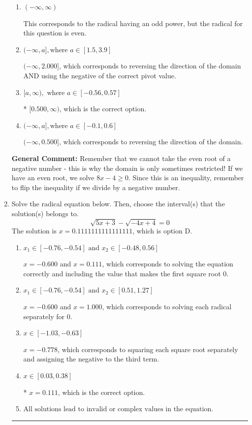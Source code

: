 \documentclass{extbook}[14pt]
\newcommand{\litem}[1]{\item #1

\rule{\textwidth}{0.4pt}}
\begin{document}
\begin{enumerate}
{\begin{enumerate}[label=\Alph*.]
$[2.000, \infty)$, which corresponds to using the negative of the correct pivot value.
\item \( (-\infty, \infty) \)

This corresponds to the radical having an odd power, but the radical for this question is even.
\item \( (-\infty, a], \text{where } a \in [1.5, 3.9] \)

$(-\infty, 2.000]$, which corresponds to reversing the direction of the domain AND using the negative of the correct pivot value.
\item \( [a, \infty), \text{ where } a \in [-0.56, 0.57] \)

* $[0.500, \infty)$, which is the correct option.
\item \( (-\infty, a], \text{where } a \in [-0.1, 0.6] \)

 $(-\infty, 0.500]$, which corresponds to reversing the direction of the domain.
\end{enumerate}

\textbf{General Comment:} Remember that we cannot take the even root of a negative number - this is why the domain is only sometimes restricted! If we have an even root, we solve $8 x - 4 \geq 0$. Since this is an inequality, remember to flip the inequality if we divide by a negative number.
}
\litem{
Solve the radical equation below. Then, choose the interval(s) that the solution(s) belongs to.
\[ \sqrt{5 x + 3} - \sqrt{-4 x + 4} = 0 \]The solution is \( x = 0.1111111111111111 \), which is option D.\begin{enumerate}[label=\Alph*.]
\item \( x_1 \in [-0.76, -0.54] \text{ and } x_2 \in [-0.48,0.56] \)

$x = -0.600$ and $x = 0.111$, which corresponds to solving the equation correctly and including the value that makes the first square root 0.
\item \( x_1 \in [-0.76, -0.54] \text{ and } x_2 \in [0.51,1.27] \)

$x = -0.600$ and $x = 1.000$, which corresponds to solving each radical separately for 0.
\item \( x \in [-1.03,-0.63] \)

$x = -0.778$, which corresponds to squaring each square root separately and assigning the negative to the third term.
\item \( x \in [0.03,0.38] \)

* $x = 0.111$, which is the correct option.
\item \( \text{All solutions lead to invalid or complex values in the equation.} \)


\end{enumerate}}
\end{enumerate}
\end{document}
